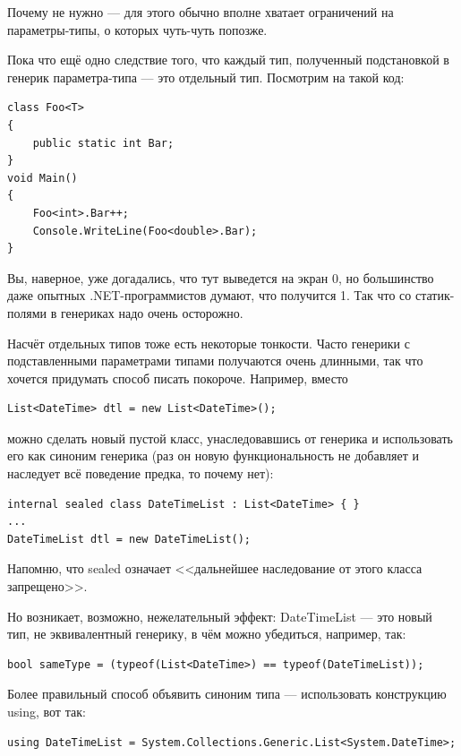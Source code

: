 \documentclass[a5paper]{article}
\begin{document}
Почему не нужно --- для этого обычно вполне хватает ограничений на параметры-типы, о которых чуть-чуть попозже.

Пока что ещё одно следствие того, что каждый тип, полученный подстановкой в генерик параметра-типа --- это отдельный тип. Посмотрим на такой код:

\begin{verbatim}
class Foo<T>
{
    public static int Bar;
}
void Main()
{
    Foo<int>.Bar++;
    Console.WriteLine(Foo<double>.Bar);
}
\end{verbatim}

Вы, наверное, уже догадались, что тут выведется на экран 0, но большинство даже опытных .NET-программистов думают, что получится 1. Так что со статик-полями в генериках надо очень осторожно.

Насчёт отдельных типов тоже есть некоторые тонкости. Часто генерики с подставленными параметрами типами получаются очень длинными, так что хочется придумать способ писать покороче. Например, вместо

\begin{verbatim}
List<DateTime> dtl = new List<DateTime>();
\end{verbatim}

можно сделать новый пустой класс, унаследовавшись от генерика и использовать его как синоним генерика (раз он новую функциональность не добавляет и наследует всё поведение предка, то почему нет):

\begin{verbatim}
internal sealed class DateTimeList : List<DateTime> { }
...
DateTimeList dtl = new DateTimeList();
\end{verbatim}

Напомню, что sealed означает <<дальнейшее наследование от этого класса запрещено>>.

Но возникает, возможно, нежелательный эффект: DateTimeList --- это новый тип, не эквивалентный генерику, в чём можно убедиться, например, так:

\begin{verbatim}
bool sameType = (typeof(List<DateTime>) == typeof(DateTimeList));
\end{verbatim}

Более правильный способ объявить синоним типа --- использовать конструкцию using, вот так:

\begin{verbatim}
using DateTimeList = System.Collections.Generic.List<System.DateTime>;
\end{verbatim}
\end{document}
